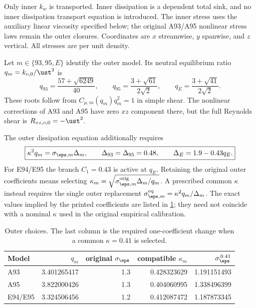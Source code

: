 Only inner \(k_w\) is transported. Inner dissipation is a dependent
total sink, and no inner dissipation transport equation is introduced.
The inner stress uses the auxiliary linear viscosity specified below;
the original A93/A95 nonlinear stress laws remain the outer closures.
Coordinates are \(x\) streamwise, \(y\) spanwise, and \(z\) vertical.
All stresses are per unit density.

Let \(m\in\{93,95,E\}\) identify the outer model.
Its neutral equilibrium ratio \(q_m=k_{o,0}/\ust^2\) is
\begin{equation}
 \boxed{
 q_{93}=\frac{57+\sqrt{6249}}{40},\qquad
 q_{95}=\frac{3+\sqrt{61}}{2\sqrt2},\qquad
 q_E=\frac{3+\sqrt{41}}{2\sqrt2}.}
 \label{mawf:q}
\end{equation}
These roots follow from \(C_{\mu,m}(q_m)q_m^2=1\) in simple shear.
The nonlinear corrections of A93 and A95 have zero \(xz\) component
there, but the full Reynolds shear is \(R_{xz,o,0}=-\ust^2\).

The outer dissipation equation additionally requires
\begin{equation}
 \boxed{\kappa^2q_m=\sigma_{\eps,m}\Delta_m,\qquad
 \Delta_{93}=\Delta_{95}=0.48,\qquad
 \Delta_E=1.9-0.43q_E.}
 \label{mawf:kappa}
\end{equation}
For E94/E95 the branch \(C_1=0.43\) is active at \(q_E\).
Retaining the original outer coefficients means selecting
\(\kappa_m=\sqrt{\sigma_{\eps,m}^{\rm orig}\Delta_m/q_m}\).
A prescribed common \(\kappa\) instead requires the single outer
replacement \(\sigma_{\eps,m}^{\rm eq}=\kappa^2q_m/\Delta_m\).
The exact values implied by the printed coefficients are listed in
\cref{mawf:outer-table}; they need not coincide with a nominal
\(\kappa\) used in the original empirical calibration.

\begin{table}[htbp]
\centering\small
\caption{Outer choices. The last column is the required one-coefficient
change when a common \(\kappa=0.41\) is selected.}
\label{mawf:outer-table}
\begin{tabular}{@{}lrrrr@{}}
\toprule
Model & \(q_m\) & original \(\sigma_\eps\)& compatible \(\kappa_m\)&
\(\sigma_\eps^{\,0.41}\)\\
\midrule
A93 &3.401265417&1.3&0.428323629&1.191151493\\
A95 &3.822000426&1.3&0.404060995&1.338496399\\
E94/E95 &3.324506456&1.2&0.412087472&1.187873345\\
\bottomrule
\end{tabular}
\end{table}

